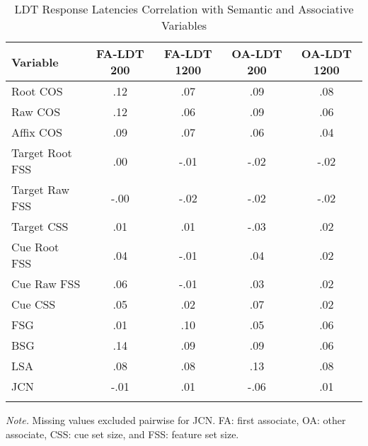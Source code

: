 \documentclass[english,man]{apa6}
\theoremstyle{definition}
\theoremstyle{definition}
\theoremstyle{definition}
\theoremstyle{remark}
\begin{document}
\begin{table}[tbp]
\begin{center}
\begin{threeparttable}
\caption{\label{tab:ldt-table}LDT Response Latencies Correlation with Semantic and Associative Variables}
\begin{tabular}{lcccc}
\toprule
Variable & \multicolumn{1}{c}{FA-LDT 200} & \multicolumn{1}{c}{FA-LDT 1200} & \multicolumn{1}{c}{OA-LDT 200} & \multicolumn{1}{c}{OA-LDT 1200}\\
\midrule
Root COS & .12 & .07 & .09 & .08\\
Raw COS & .12 & .06 & .09 & .06\\
Affix COS & .09 & .07 & .06 & .04\\
Target Root FSS & .00 & -.01 & -.02 & -.02\\
Target Raw FSS & -.00 & -.02 & -.02 & -.02\\
Target CSS & .01 & .01 & -.03 & .02\\
Cue Root FSS & .04 & -.01 & .04 & .02\\
Cue Raw FSS & .06 & -.01 & .03 & .02\\
Cue CSS & .05 & .02 & .07 & .02\\
FSG & .01 & .10 & .05 & .06\\
BSG & .14 & .09 & .09 & .06\\
LSA & .08 & .08 & .13 & .08\\
JCN & -.01 & .01 & -.06 & .01\\
\bottomrule
\addlinespace
\end{tabular}
\begin{tablenotes}[para]
\textit{Note.} Missing values excluded pairwise for JCN. FA: first associate, OA: other associate, CSS: cue set size, and FSS: feature set size.
\end{tablenotes}
\end{threeparttable}
\end{center}
\end{table}
\end{document}
